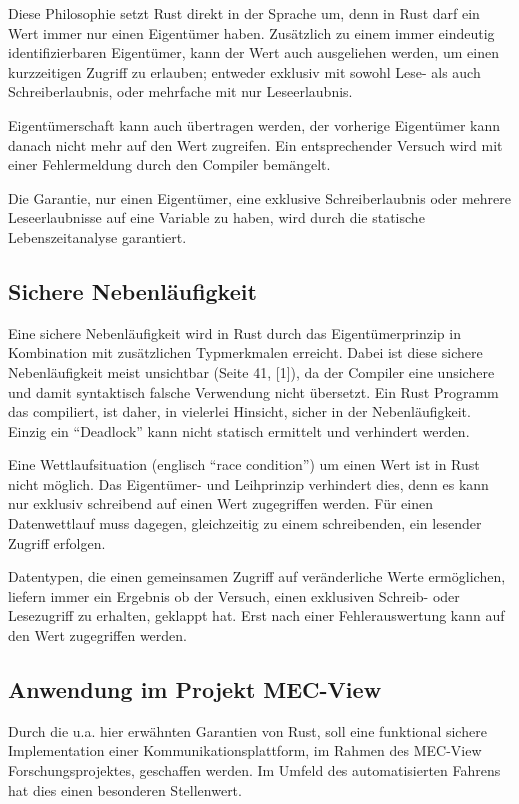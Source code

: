 \begin{multicols}{2}
Diese Philosophie setzt Rust direkt in der Sprache um, denn in Rust darf ein Wert immer nur einen Eigentümer haben.
Zusätzlich zu einem immer eindeutig identifizierbaren Eigentümer, kann der Wert auch ausgeliehen werden, um einen kurzzeitigen Zugriff zu erlauben; entweder exklusiv mit sowohl Lese- als auch Schreiberlaubnis, oder mehrfache mit nur Leseerlaubnis.

Eigentümerschaft kann auch übertragen werden, der vorherige Eigentümer kann danach nicht mehr auf den Wert zugreifen.
Ein entsprechender Versuch wird mit einer Fehlermeldung durch den Compiler bemängelt.

Die Garantie, nur einen Eigentümer, eine exklusive Schreiberlaubnis oder mehrere Leseerlaubnisse auf eine Variable zu haben, wird durch die statische Lebenszeitanalyse garantiert.

\subsection*{Sichere Nebenläufigkeit}

Eine sichere Nebenläufigkeit wird in Rust durch das Eigentümerprinzip in Kombination mit zusätzlichen Typmerkmalen erreicht.
Dabei ist diese sichere Nebenläufigkeit meist unsichtbar (Seite 41, [1]), da der Compiler eine unsichere und damit syntaktisch falsche Verwendung nicht übersetzt.
Ein Rust Programm das compiliert, ist daher, in vielerlei Hinsicht, sicher in der Nebenläufigkeit.
Einzig ein \enquote{Deadlock} kann nicht statisch ermittelt und verhindert werden.

Eine Wettlaufsituation (englisch \enquote{race condition}) um einen Wert ist in Rust nicht möglich.
Das Eigentümer- und Leihprinzip verhindert dies, denn es kann nur exklusiv schreibend auf einen Wert zugegriffen werden.
Für einen Datenwettlauf muss dagegen, gleichzeitig zu einem schreibenden, ein lesender Zugriff erfolgen.

Datentypen, die einen gemeinsamen Zugriff auf veränderliche Werte ermöglichen, liefern immer ein Ergebnis ob der Versuch, einen exklusiven Schreib- oder Lesezugriff zu erhalten, geklappt hat.
Erst nach einer Fehlerauswertung kann auf den Wert zugegriffen werden.

\subsection*{Anwendung im Projekt MEC-View}

\bildIII

Durch die u.a. hier erwähnten Garantien von Rust, soll eine funktional sichere Implementation einer Kommunikationsplattform, im Rahmen des MEC-View Forschungsprojektes, geschaffen werden.
Im Umfeld des automatisierten Fahrens hat dies einen besonderen Stellenwert.

\bildII

\end{multicols}
